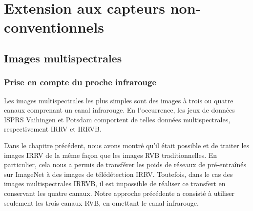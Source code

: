 \chapter{Extension aux capteurs non-conventionnels}
\label{chap:extension}


\section{Images multispectrales}

\subsection{Prise en compte du proche infrarouge}

Les images multispectrales les plus simples sont des images à trois ou quatre canaux comprenant un canal infrarouge. En l'occurrence, les jeux de données \gls{ISPRS} Vaihingen et Potsdam comportent de telles données multispectrales, respectivement \gls{IRRV} et \gls{IRRVB}.

Dans le chapitre précédent, nous avons montré qu'il était possible et de traiter les images \gls{IRRV} de la même façon que les images \gls{RVB} traditionnelles. En particulier, cela nous a permis de transférer les poids de réseaux de pré-entraînés sur ImageNet à des images de télédétection \gls{IRRV}. Toutefois, dans le cas des images multispectrales \gls{IRRVB}, il est impossible de réaliser ce transfert en conservant les quatre canaux. Notre approche précédente a consisté à utiliser seulement les trois canaux \gls{RVB}, en omettant le canal infrarouge.

